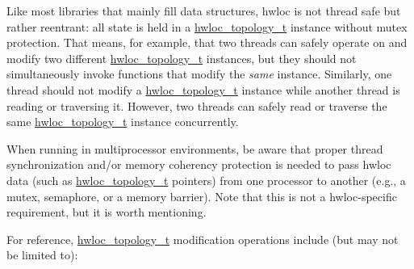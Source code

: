 

Like most libraries that mainly fill data structures, hwloc is not thread safe but rather reentrant\+: all state is held in a \hyperlink{a00186_ga9d1e76ee15a7dee158b786c30b6a6e38}{hwloc\+\_\+topology\+\_\+t} instance without mutex protection. That means, for example, that two threads can safely operate on and modify two different \hyperlink{a00186_ga9d1e76ee15a7dee158b786c30b6a6e38}{hwloc\+\_\+topology\+\_\+t} instances, but they should not simultaneously invoke functions that modify the {\itshape same} instance. Similarly, one thread should not modify a \hyperlink{a00186_ga9d1e76ee15a7dee158b786c30b6a6e38}{hwloc\+\_\+topology\+\_\+t} instance while another thread is reading or traversing it. However, two threads can safely read or traverse the same \hyperlink{a00186_ga9d1e76ee15a7dee158b786c30b6a6e38}{hwloc\+\_\+topology\+\_\+t} instance concurrently.

When running in multiprocessor environments, be aware that proper thread synchronization and/or memory coherency protection is needed to pass hwloc data (such as \hyperlink{a00186_ga9d1e76ee15a7dee158b786c30b6a6e38}{hwloc\+\_\+topology\+\_\+t} pointers) from one processor to another (e.\+g., a mutex, semaphore, or a memory barrier). Note that this is not a hwloc-\/specific requirement, but it is worth mentioning.

For reference, \hyperlink{a00186_ga9d1e76ee15a7dee158b786c30b6a6e38}{hwloc\+\_\+topology\+\_\+t} modification operations include (but may not be limited to)\+:


